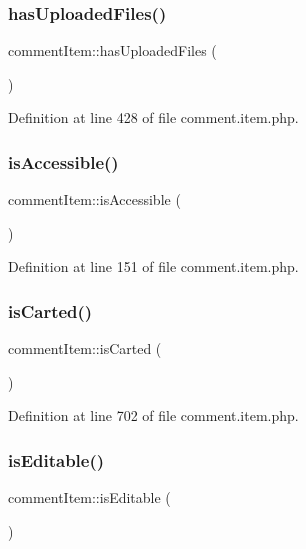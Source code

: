 \subsubsection{\texorpdfstring{has\+Uploaded\+Files()}{hasUploadedFiles()}}
{\footnotesize\ttfamily comment\+Item\+::has\+Uploaded\+Files (\begin{DoxyParamCaption}{ }\end{DoxyParamCaption})}



Definition at line 428 of file comment.\+item.\+php.

\mbox{\label{classcommentItem_a5a175cf38e7a6dd7b1b771b198388e25}} 
\subsubsection{\texorpdfstring{is\+Accessible()}{isAccessible()}}
{\footnotesize\ttfamily comment\+Item\+::is\+Accessible (\begin{DoxyParamCaption}{ }\end{DoxyParamCaption})}



Definition at line 151 of file comment.\+item.\+php.

\mbox{\label{classcommentItem_aee548a05480bd060de454017aa8be318}} 
\subsubsection{\texorpdfstring{is\+Carted()}{isCarted()}}
{\footnotesize\ttfamily comment\+Item\+::is\+Carted (\begin{DoxyParamCaption}{ }\end{DoxyParamCaption})}



Definition at line 702 of file comment.\+item.\+php.

\mbox{\label{classcommentItem_a53a357acf0d2d4c951505383c94a6373}} 
\subsubsection{\texorpdfstring{is\+Editable()}{isEditable()}}
{\footnotesize\ttfamily comment\+Item\+::is\+Editable (\begin{DoxyParamCaption}{ }\end{DoxyParamCaption})}



